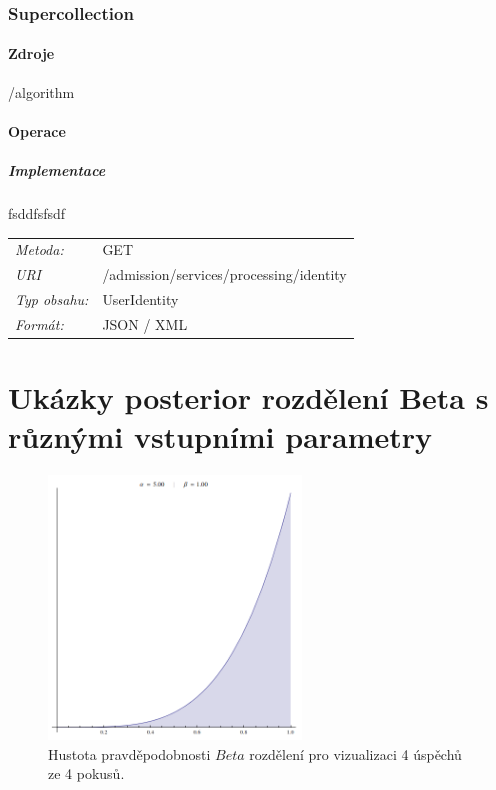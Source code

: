 \documentclass[thesis=M,czech]{FITthesis}[2014/05/07]
\begin{document}
\subsection{Supercollection}

\subsubsection{Zdroje}

\begin{description}
	\item[/algorithm]
	\item[]
	\item[]
\end{description}

\subsubsection{Operace}

\paragraph*{Implementace}

fsddfsfsdf

\begin{center}
 	\begin{tabular}{lp{10cm}}
 		\textit{Metoda:}		& GET			\tabularnewline 
 		\textit{URI}		& /admission/services/processing/identity			\tabularnewline 
 		\textit{Typ obsahu:}		& UserIdentity			\tabularnewline  		
 		\textit{Formát:}		& JSON / XML			\tabularnewline 		
 	\end{tabular}
\end{center} 	

\chapter{Ukázky posterior rozdělení Beta s různými vstupními parametry}

\begin{figure}\centering
	\includegraphics[width=0.6\textwidth]{obr/beta1.png}
 	\caption[Hustota pravděpodobnosti $Beta$ rozdělení pro vizualizaci 4 úspěchů ze 4 pokusů.]{Hustota pravděpodobnosti $Beta$ rozdělení pro vizualizaci 4 úspěchů ze 4 pokusů.}\label{fig:beta1}
\end{figure}	
\end{document}
